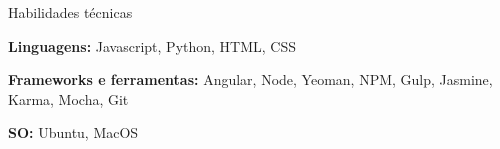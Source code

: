 \begin{rubric}{Habilidades técnicas}

  \entry* \textbf{Linguagens:} Javascript, Python, HTML, CSS

  \entry* \textbf{Frameworks e ferramentas:} Angular, Node, Yeoman, NPM, Gulp, Jasmine, Karma, Mocha, Git

  \entry* \textbf{SO:} Ubuntu, MacOS


\end{rubric}
